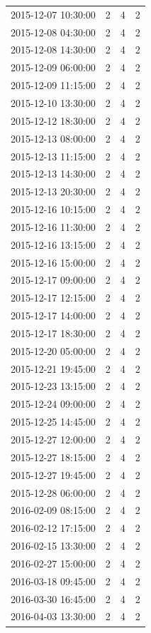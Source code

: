 \begin{tabular}{lrrr}
2015-12-07 10:30:00 & 2 & 4 & 2 \\
2015-12-08 04:30:00 & 2 & 4 & 2 \\
2015-12-08 14:30:00 & 2 & 4 & 2 \\
2015-12-09 06:00:00 & 2 & 4 & 2 \\
2015-12-09 11:15:00 & 2 & 4 & 2 \\
2015-12-10 13:30:00 & 2 & 4 & 2 \\
2015-12-12 18:30:00 & 2 & 4 & 2 \\
2015-12-13 08:00:00 & 2 & 4 & 2 \\
2015-12-13 11:15:00 & 2 & 4 & 2 \\
2015-12-13 14:30:00 & 2 & 4 & 2 \\
2015-12-13 20:30:00 & 2 & 4 & 2 \\
2015-12-16 10:15:00 & 2 & 4 & 2 \\
2015-12-16 11:30:00 & 2 & 4 & 2 \\
2015-12-16 13:15:00 & 2 & 4 & 2 \\
2015-12-16 15:00:00 & 2 & 4 & 2 \\
2015-12-17 09:00:00 & 2 & 4 & 2 \\
2015-12-17 12:15:00 & 2 & 4 & 2 \\
2015-12-17 14:00:00 & 2 & 4 & 2 \\
2015-12-17 18:30:00 & 2 & 4 & 2 \\
2015-12-20 05:00:00 & 2 & 4 & 2 \\
2015-12-21 19:45:00 & 2 & 4 & 2 \\
2015-12-23 13:15:00 & 2 & 4 & 2 \\
2015-12-24 09:00:00 & 2 & 4 & 2 \\
2015-12-25 14:45:00 & 2 & 4 & 2 \\
2015-12-27 12:00:00 & 2 & 4 & 2 \\
2015-12-27 18:15:00 & 2 & 4 & 2 \\
2015-12-27 19:45:00 & 2 & 4 & 2 \\
2015-12-28 06:00:00 & 2 & 4 & 2 \\
2016-02-09 08:15:00 & 2 & 4 & 2 \\
2016-02-12 17:15:00 & 2 & 4 & 2 \\
2016-02-15 13:30:00 & 2 & 4 & 2 \\
2016-02-27 15:00:00 & 2 & 4 & 2 \\
2016-03-18 09:45:00 & 2 & 4 & 2 \\
2016-03-30 16:45:00 & 2 & 4 & 2 \\
2016-04-03 13:30:00 & 2 & 4 & 2 \\

\end{tabular}
